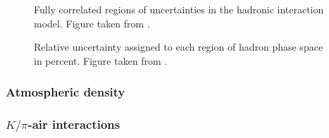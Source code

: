 \begin{figure}
    \centering
    
    \caption{Fully correlated regions of uncertainties in the hadronic interaction model. Figure taken from \cite{Barr2006}.}
\end{figure}
\begin{figure}
    \centering
    
    \caption{Relative uncertainty assigned to each region of hadron phase space in percent. Figure taken from \cite{Barr2006}.}
\end{figure}


\subsubsection{Atmospheric density}

\subsubsection{$K/\pi$-air interactions}

